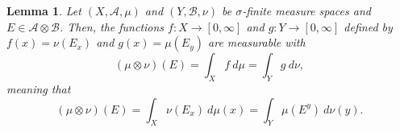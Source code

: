 \documentclass[a4paper, openany]{memoir}
\theoremstyle{definition}
\theoremstyle{plain}
\newtheorem{lemma}[definition]{Lemma}
\newtheorem{proposition}[definition]{Proposition}
\begin{document}
        

    \begin{lemma}
        Let $(X, \mathcal{A}, \mu)$ and $(Y, \mathcal{B}, \nu)$ be $\sigma$-finite measure spaces and $E \in \mathcal{A} \otimes \mathcal{B}$. Then, the functions $f \colon X \to [0, \infty]$ and $g \colon Y \to [0, \infty]$ defined by $f(x) = \nu(E_x)$ and $g(x) = \mu(E_y)$ are measurable with
        \[(\mu \otimes \nu)(E) = \int_X f \ d\mu = \int_Y g \ d\nu,\]
        meaning that
        \[(\mu \otimes \nu)(E) = \int_X \nu(E_x) \ d\mu(x) = \int_Y \mu(E^y) \ d\nu(y).\]
    \end{lemma}
\end{document}
